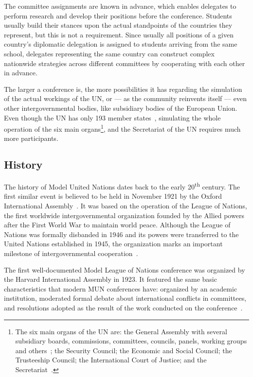 The committee assignments are known in advance, which enables delegates to perform research and develop their positions before the conference. Students usually build their stances upon the actual standpoints of the countries they represent, but this is not a requirement. Since usually all positions of a given country's diplomatic delegation is assigned to students arriving from the same school, delegates representing the same country can construct complex nationwide strategies across different committees by cooperating with each other in advance.

The larger a conference is, the more possibilities it has regarding the simulation of the actual workings of the UN, or — as the community reinvents itself — even other intergovernmental bodies, like subsidiary bodies of the European Union. Even though the UN has only 193 member states~\cite{unmembers}, simulating the whole operation of the six main organs\footnote{The six main organs of the UN are: the General Assembly with several subsidiary boards, commissions, committees, councils, panels, working groups and others~\cite{gasubsidiaries}; the Security Council; the Economic and Social Council; the Trusteeship Council; the International Court of Justice; and the Secretariat~\cite{unmainorgans}.}, and the Secretariat of the UN requires much more participants.

\subsection{History}

The history of Model United Nations dates back to the early 20\textsuperscript{th} century. The first similar event is believed to be held in November 1921 by the Oxford International Assembly~\cite{historyofthefirstmun}. It was based on the operation of the League of Nations, the first worldwide intergovernmental organization founded by the Allied powers after the First World War to maintain world peace. Although the League of Nations was formally disbanded in 1946 and its powers were transferred to the United Nations established in 1945, the organization marks an important milestone of intergovernmental cooperation~\cite{leagueofnationsbritannica}.

The first well-documented Model League of Nations conference was organized by the Harvard International Assembly in 1923. It featured the same basic characteristics that modern MUN conferences have: organized by an academic institution, moderated formal debate about international conflicts in committees, and resolutions adopted as the result of the work conducted on the conference~\cite{historyofthefirstmun}.

